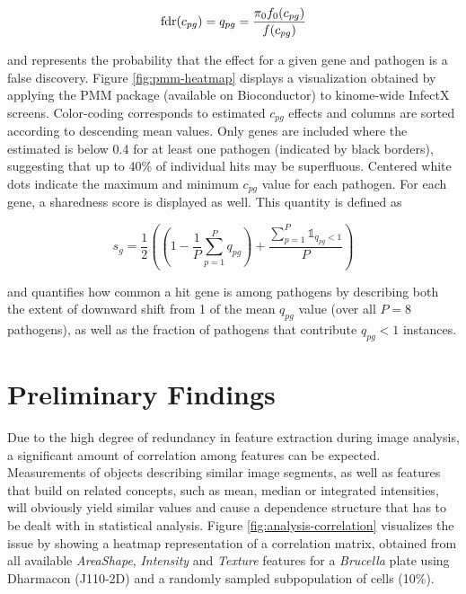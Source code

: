 

\begin{equation}
  \operatorname{fdr}(c_{pg}) = q_{pg} = \frac{\pi_0 f_0(c_{pg})}{f(c_{pg})}
\end{equation}

and represents the probability that the effect for a given gene and pathogen is a false discovery. Figure \ref{fig:pmm-heatmap} displays a visualization obtained by applying the PMM package (available on Bioconductor) to kinome-wide InfectX screens. Color-coding corresponds to estimated $c_{pg}$ effects and columns are sorted according to descending mean values. Only genes are included where the estimated  is below 0.4 for at least one pathogen (indicated by black borders), suggesting that up to 40\% of individual hits may be superfluous. Centered white dots indicate the maximum and minimum $c_{pg}$ value for each pathogen. For each gene, a sharedness score is displayed as well. This quantity is defined as

\begin{equation}
  s_g = \frac{1}{2} \left(\left(1-\frac{1}{P}\sum_{p=1}^P q_{pg}\right) + \frac{\sum_{p=1}^P \mathds{1}_{q_{pg} < 1}}{P}\right)
\end{equation}

and quantifies how common a hit gene is among pathogens by describing both the extent of downward shift from 1 of the mean $q_{pg}$ value (over all $P=8$ pathogens), as well as the fraction of pathogens that contribute $q_{pg} < 1$ instances.

\section{Preliminary Findings}
\label{sec:preliminary-res}
Due to the high degree of redundancy in feature extraction during image analysis, a significant amount of correlation among features can be expected. Measurements of objects describing similar image segments, as well as features that build on related concepts, such as mean, median or integrated intensities, will obviously yield similar values and cause a dependence structure that has to be dealt with in statistical analysis. Figure \ref{fig:analysis-correlation} visualizes the issue by showing a heatmap representation of a correlation matrix, obtained from all available \textit{AreaShape}, \textit{Intensity} and \textit{Texture} features for a \textit{Brucella} plate using Dharmacon  (J110-2D) and a randomly sampled subpopulation of cells (10\%).

